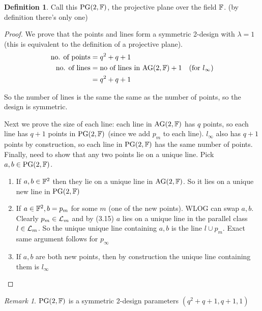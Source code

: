\documentclass[]{article}
\theoremstyle{definition}
\newtheorem*{defn}{Definition}
\theoremstyle{remark}
\newtheorem*{rem}{Remark}
\numberwithin{equation}{section}
\begin{document}
			\begin{defn}
				Call this $\text{PG}(2, \mathbb F)$, the projective plane over the field $\mathbb F$. (by definition there's only one)
			\end{defn}

			\begin{proof}
				We prove that the points and lines form a symmetric 2-design with $\lambda = 1$ (this is equivalent to the definition of a projective plane).\\

				\begin{align*}
					\text{no. of points} &= q^2 + q + 1\\
					\text{no. of lines} &= \text{no of lines in $\text{AG}(2,\mathbb F)$} + 1 \quad \text{(for $l_\infty$)}\\
										&= q^2 + q + 1
				\end{align*}

				So the number of lines is the same the same as the number of points, so the design is symmetric.

				Next we prove the size of each line: each line in $\text{AG}(2,\mathbb F)$ has $q$ points, so each line has $q + 1$ points in  $\text{PG}(2, \mathbb F)$ (since we add $p_m$ to each line). $l_\infty$ also has $q+1$ points by construction, so each line in  $\text{PG}(2, \mathbb F)$ has the same number of points.\\

				Finally, need to show that any two points lie on a unique line. Pick $a, b \in  \text{PG}(2, \mathbb F)$.
				\begin{enumerate}
					\item If $a,b \in \mathbb F^2$ then they lie on a unique line in $\text{AG}(2,\mathbb F)$. So it lies on a unique new line in $\text{PG}(2, \mathbb F)$
					\item If $a\in \mathbb F^2, b=p_m$ for some $m$ (one of the new points). WLOG can swap $a, b$. Clearly $p_m \in \mathcal{L}_m$ and by (3.15) $a$ lies on a unique line in the parallel class $l \in \mathcal{L}_m$. So the unique unique line containing $a, b$ is the line $l \cup p_m$. Exact same argument follows for $p_\infty$
					\item If $a, b$ are both new points, then by construction the unique line containing them is $l_\infty$
				\end{enumerate}
			\end{proof}
			\begin{rem}
				$\text{PG}(2, \mathbb F)$ is a symmetric 2-design parameters $(q^2 + q + 1, q + 1, 1)$
			\end{rem}
\end{document}
